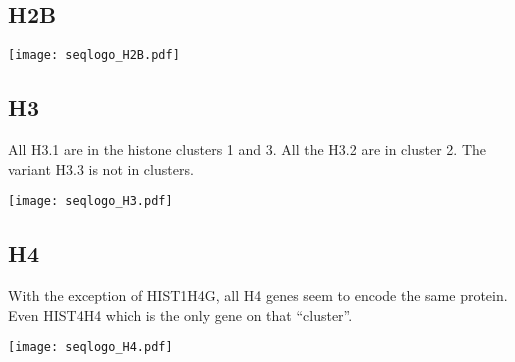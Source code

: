 
  \subsection{H2B}
    \begin{TableAndFigure*}
      \label{tab:H2B-consensus}
      

      \texttt{[image: seqlogo\_H2B.pdf]}
      \label{fig:H2B-weblogo}
    \end{TableAndFigure*}

  \subsection{H3}

    All H3.1 are in the histone clusters 1 and 3. All the H3.2 are in cluster 2.
    The variant H3.3 is not in clusters.


    \begin{TableAndFigure*}
      \label{tab:H3-consensus}
      

      \texttt{[image: seqlogo\_H3.pdf]}
      \label{fig:H3-weblogo}
    \end{TableAndFigure*}

  \subsection{H4}
    With the exception of HIST1H4G, all H4 genes seem to encode the same protein. Even HIST4H4 which is the
    only gene on that ``cluster''.
    \begin{TableAndFigure*}
      \label{tab:H4-consensus}
      

      \texttt{[image: seqlogo\_H4.pdf]}
      \label{fig:H4-weblogo}
    \end{TableAndFigure*}

